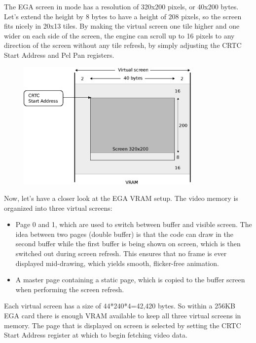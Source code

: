 \documentclass[book.tex]{subfiles}
\begin{document}
\par
The EGA screen in mode  has a resolution of 320x200 pixels, or 40x200 bytes. Let's extend the height by 8 bytes to have a height of 208 pixels, so the screen fits nicely in 20x13 tiles. By making the virtual screen one tile higher and one wider on each side of the screen, the engine can scroll up to 16 pixels to any direction of the screen without any tile refresh, by simply adjusting the CRTC Start Address and Pel Pan registers.\\


\begin{figure}[H]
\centering
\includegraphics[width=0.8\textwidth]{imgs/drawings/ATR_virtual_screen.eps}
\label{fig:atr_virtual screen}
\end{figure}

 
 
Now, let's have a closer look at the EGA VRAM setup. The video memory is organized into three virtual screens:
\begin{itemize}
\item Page 0 and 1, which are used to switch between buffer and visible screen. The idea between two pages (double buffer) is that the code can draw in the second buffer while the first buffer is being shown on screen, which is then switched out during screen refresh. This ensures that no frame is ever displayed mid-drawing, which yields smooth, flicker-free animation.
\item A master page containing a static page, which is copied to the buffer screen when performing the screen refresh.
\end{itemize}



\par
Each virtual screen has a size of 44*240*4=42,420 bytes. So within a 256KB EGA card there is enough VRAM available to keep all three virtual screens in memory. The page that is displayed on screen is selected by setting the CRTC Start Address register at which to begin fetching video data.\\
\end{document}
